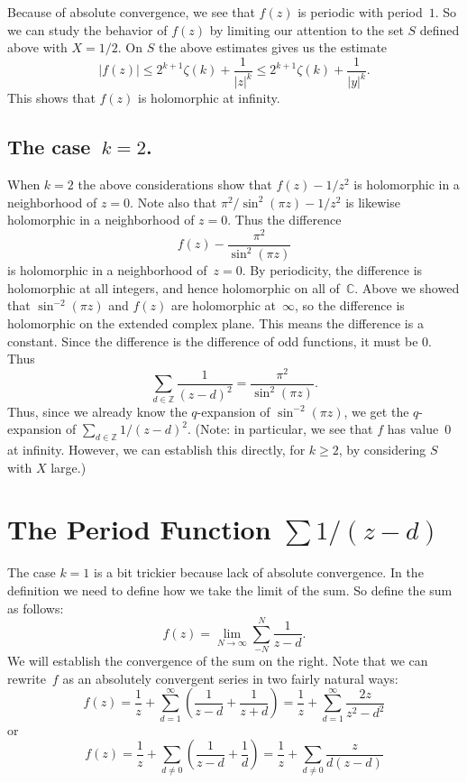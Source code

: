 \documentclass {amsart}
\theoremstyle{plain}
\theoremstyle{definition}
\theoremstyle{remark}
\newcommand{\bZ}{{\mathbb{Z}}}
\newcommand{\bC}{{\mathbb{C}}}
\begin{document}
Because of absolute convergence, we see that $f(z)$ is periodic with period~$1$.
So we can study the behavior of $f(z)$ by limiting our attention to the set $S$ defined
above with $X = 1/2$. On $S$ the above estimates gives us the estimate
$$
|f(z)| \le 2^{k+1} \zeta (k) + \frac{1}{|z|^k} \le 2^{k+1} \zeta (k) + \frac{1}{|y|^k}.
$$
This shows that $f(z)$ is holomorphic at infinity.

\subsection{The case~$k=2$.}  When $k=2$
the above considerations show that $f(z) - 1/z^2$ is holomorphic
in a neighborhood of $z=0$. Note also that $\pi^2 / \sin^{2} (\pi z) - 1/z^2$ is likewise
holomorphic in a neighborhood of $z=0$. Thus the difference
$$f(z) - \frac {\pi^2} {\sin^{2} (\pi z)} $$
 is holomorphic in a neighborhood of~$z = 0$. By periodicity,
the difference is holomorphic at all integers, and hence holomorphic on all of~$\bC$. Above
we showed that $\sin^{-2}(\pi z)$ and $f(z)$ are holomorphic at~$\infty$, so the
difference is holomorphic on the extended complex plane.
This means the difference is a constant.
Since the difference is the difference of odd functions, it must be $0$. Thus
$$
  \sum_{d \in\bZ}  \frac{1}{ (z - d)^2} = \frac {\pi^2} {\sin^{2} (\pi z)}.
$$
Thus, since we already know the $q$-expansion of $\sin^{-2} (\pi z)$, we get the
$q$-expansion of $\sum_{d \in\bZ}  1/ (z - d)^2$.
(Note: in particular, we see that $f$ has value~$0$ at infinity. However, we can establish this
directly, for $k \ge 2$, by considering $S$ with $X$ large.)



\section {The Period Function $\sum 1/ (z - d)$}

The case $k=1$ is a bit trickier because lack of absolute convergence.
In the definition we need to define how we take the limit of the sum. So define
the sum as follows:
$$
f (z)  = \lim_{N \to \infty} \sum_{-N}^{N} \frac{1}{z - d}.
$$
We will establish the convergence of the sum on the right. 
Note that  we can rewrite~$f$ as an absolutely convergent series in two
fairly natural ways:
$$
f(z) = \frac{1}{z} +  \sum_{d = 1}^\infty \left( \frac{1}{z - d} + \frac{1} {z + d} \right)
=
\frac{1}{z} +  \sum_{d = 1}^\infty \frac{2 z}{z^2 - d^2} 
$$
or
$$
f(z) =  \frac{1}{z}  + \sum_{d \ne 0}\left( \frac{1}{z - d} + \frac{1}{d} \right)
= \frac{1}{z}  + \sum_{d \ne 0}  \frac{z}{d(z - d)}
$$
\end{document}
